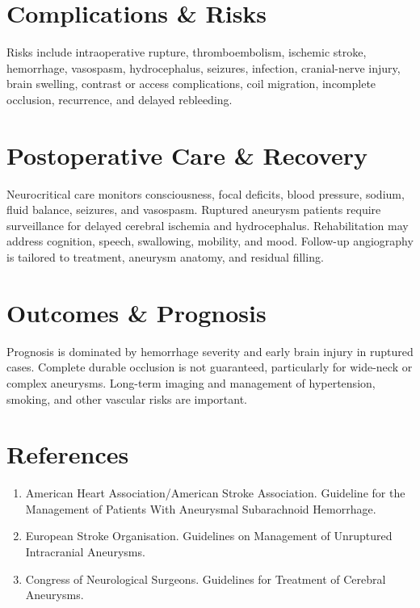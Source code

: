 \section*{Complications \& Risks}
Risks include intraoperative rupture, thromboembolism, ischemic stroke, hemorrhage, vasospasm, hydrocephalus, seizures, infection, cranial-nerve injury, brain swelling, contrast or access complications, coil migration, incomplete occlusion, recurrence, and delayed rebleeding.

\section*{Postoperative Care \& Recovery}
Neurocritical care monitors consciousness, focal deficits, blood pressure, sodium, fluid balance, seizures, and vasospasm. Ruptured aneurysm patients require surveillance for delayed cerebral ischemia and hydrocephalus. Rehabilitation may address cognition, speech, swallowing, mobility, and mood. Follow-up angiography is tailored to treatment, aneurysm anatomy, and residual filling.

\section*{Outcomes \& Prognosis}
Prognosis is dominated by hemorrhage severity and early brain injury in ruptured cases. Complete durable occlusion is not guaranteed, particularly for wide-neck or complex aneurysms. Long-term imaging and management of hypertension, smoking, and other vascular risks are important.

\section*{References}
\begin{enumerate}
  \item American Heart Association/American Stroke Association. Guideline for the Management of Patients With Aneurysmal Subarachnoid Hemorrhage.
  \item European Stroke Organisation. Guidelines on Management of Unruptured Intracranial Aneurysms.
  \item Congress of Neurological Surgeons. Guidelines for Treatment of Cerebral Aneurysms.
\end{enumerate}

\clearpage
